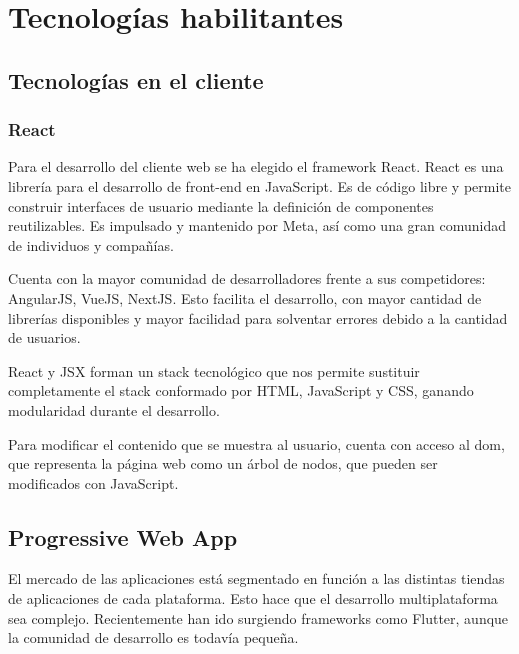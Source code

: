 \chapter{Tecnologías habilitantes}
\label{chap:enabling_technologies}


\section{Tecnologías en el cliente}
\label{tec_hab:client}

\subsection{React}
\label{tec_hab:react}


Para el desarrollo del cliente web se ha elegido el framework React. React es una librería para el desarrollo de front-end en JavaScript. Es de código libre y permite construir interfaces de usuario mediante la definición de componentes reutilizables. Es impulsado y mantenido por Meta, así como una gran comunidad de individuos y compañías.

Cuenta con la mayor comunidad de desarrolladores frente a sus competidores: AngularJS, VueJS, NextJS. Esto facilita el desarrollo, con mayor cantidad de librerías disponibles y mayor facilidad para solventar errores debido a la cantidad de usuarios.

React y JSX forman un stack tecnológico que nos permite sustituir completamente el stack conformado por HTML, JavaScript y CSS, ganando modularidad durante el desarrollo.

Para modificar el contenido que se muestra al usuario, cuenta con acceso al \acrshort{dom}, que representa la página web como un árbol de nodos, que pueden ser modificados con JavaScript.

\section{Progressive Web App}
\label{tec_hab:PWA}

El mercado de las aplicaciones está segmentado en función a las distintas tiendas de aplicaciones de cada plataforma. Esto hace que el desarrollo multiplataforma sea complejo. Recientemente han ido surgiendo frameworks como Flutter, aunque la comunidad de desarrollo es todavía pequeña.

